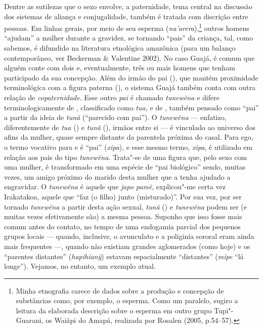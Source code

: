 Dentre as sutilezas que o sexo envolve, a paternidade, tema central na
discussão dos sistemas de aliança e conjugalidade, também é tratada com
discrição entre pessoas. Em linhas gerais, por meio de seu esperma
(\emph{na'arera}),\footnote{Minha etnografia carece de dados sobre a
  produção e concepção de substâncias como, por exemplo, o esperma. Como
  um paralelo, sugiro a leitura da elaborada descrição sobre o esperma
  em outro grupo Tupi"-Guarani, os Waiãpi do Amapá, realizada por Rosalen
  (2005, p.54--57).} outros homens ``ajudam'' a mulher durante a
gravidez, se tornando ``pais'' da criança, tal, como sabemos, é
difundido na literatura etnológica amazônica (para um balanço
contemporâneo, ver Beckerman \& Valentine 2002). No caso Guajá, é comum
que alguém conte com dois e, eventualmente, três ou mais homens que
tenham participado da sua concepção. Além do irmão do pai (), que
mantém proximidade terminológica com a figura paterna (), o sistema
Guajá também conta com outra relação de \emph{copaternidade}. Esse outro
\emph{pai} é chamado \emph{tunewẽna} e difere terminologicamente de ,
classificado como \emph{tua,} e de , também pensado como ``pai'' a
partir da ideia de \emph{tunã} (``parecido com pai''). O \emph{tunewẽna}
--- enfatizo, diferentemente de \emph{tua} () e \emph{tunã} (), irmãos
entre si --- é vinculado ao universo dos afins da mulher, quase sempre
distante da parentela próxima do casal. Para ego, o termo vocativo para
 e  é ``pai'' (\emph{xipa}), e esse mesmo termo, \emph{xipa}, é
utilizado em relação aos pais do tipo \emph{tunewẽna}. Trata"-se de uma
figura que, pelo sexo com uma mulher, é transformado em uma espécie de
``pai biológico'' sendo, muitas vezes, um amigo próximo do marido desta
mulher que a tenha ajudado a engravidar. O \emph{tunewẽna} é aquele que
\emph{japo pamẽ}, explicou"-me certa vez Irakatakoa, aquele que ``faz (o
filho) junto (misturado)''. Por sua vez, por ser tornado \emph{tunewẽna}
a partir desta ação sexual, \emph{tunã} () e \emph{tunewẽna} podem ser
(e muitas vezes efetivamente são) a mesma pessoa. Suponho que isso fosse
mais comum antes do contato, no tempo de uma endogamia parcial dos
pequenos grupos locais --- quando, inclusive, o avunculato e a poliginia
sororal eram ainda mais frequentes ---, quando não existiam grandes
aglomerados (como hoje) e os ``parentes distantes'' (\emph{hapihianỹ})
estavam espacialmente ``distantes'' (\emph{mĩpe} ``lá longe''). Vejamos,
no entanto, um exemplo atual.

